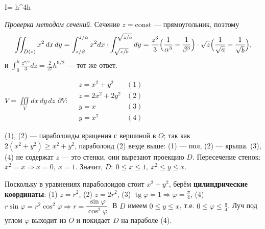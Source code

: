 \begin{answerbox}
I=\,\,h^4\sqrt h
\end{answerbox}

\emph{Проверка методом сечений.} Сечение $z=\mathrm{const}$ --- прямоугольник, поэтому
\[
\iint_{D(z)}x^2\,dx\,dy=\int_{z/\beta}^{z/\alpha}x^2dx\cdot\int_{\sqrt{z/b}}^{\sqrt{z/a}}dy=\frac{z^3}{3}\Bigl(\frac1{\alpha^3}-\frac1{\beta^3}\Bigr)\cdot\sqrt z\Bigl(\frac1{\sqrt a}-\frac1{\sqrt b}\Bigr),
\]
и $\int_0^h\frac{z^{7/2}}{3}dz=\frac{2}{27}h^{9/2}$ --- тот же ответ. \checkmark


\begin{shapka}
$\displaystyle V=\iiint\limits_{V}dx\,dy\,dz$
\tcblower
$\partial V:\quad
\begin{array}{ll}
z=x^2+y^2 & (1)\\
z=2x^2+2y^2 & (2)\\
y=x & (3)\\
y=x^2 & (4)
\end{array}$
\end{shapka}

(1), (2) --- параболоиды вращения с вершиной в $O$; так как $2(x^2+y^2)\geqslant x^2+y^2$, параболоид (2) везде выше: (1) --- пол, (2) --- крыша. (3), (4) не содержат $z$ --- это стенки, они вырезают проекцию $D$.
Пересечение стенок: $x^2=x\Rightarrow x=0,\ x=1$. Значит, $D:\ 0\leqslant x\leqslant1,\ x^2\leqslant y\leqslant x$.

Поскольку в уравнениях параболоидов стоит $x^2+y^2$, берём \textbf{цилиндрические координаты}: (1) $z=r^2$, (2) $z=2r^2$, (3) $\operatorname{tg}\varphi=1\Rightarrow\varphi=\frac\pi4$, (4) $r\sin\varphi=r^2\cos^2\varphi\Rightarrow r=\dfrac{\sin\varphi}{\cos^2\varphi}$.
В $D$ имеем $0\leqslant y\leqslant x$, т.е. $0\leqslant\varphi\leqslant\frac\pi4$. Луч под углом $\varphi$ выходит из $O$ и покидает $D$ на параболе (4).

